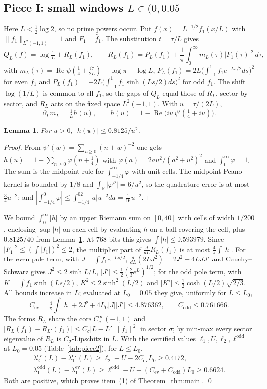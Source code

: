 \documentclass[11pt]{amsart}
\newcommand{\ev}{\mathrm{ev}}
\newcommand{\od}{\mathrm{odd}}
\newcommand{\R}{\mathbb{R}}
\newcommand{\re}{\operatorname{Re}}
\newtheorem{lemma}[theorem]{Lemma}
\theoremstyle{definition}
\theoremstyle{remark}
\numberwithin{equation}{section}
\begin{document}
\subsection{Piece I: small windows $L\in(0,0.05]$}\label{sec:piece1}
Here $L<\tfrac12\log2$, so no prime powers occur. Put $f(x)=L^{-1/2}f_1(x/L)$ with $\|f_1\|_{L^2(-1,1)}=1$ and $F_1=\hat f_1$. The substitution $t=\tau/L$ gives
\[
Q_L(f)=\log\tfrac1L+R_L(f_1),\qquad R_L(f_1)=P_L(f_1)+\frac1\pi\int_0^\infty m_L(\tau)|F_1(\tau)|^2\,d\tau,
\]
with $m_L(\tau)=\re\psi(\tfrac14+\tfrac{i\tau}{2L})-\log\pi+\log L$, $P_L(f_1)=2L\bigl(\int_{-1}^1f_1e^{-Ls/2}ds\bigr)^2$ for even $f_1$ and $P_L(f_1)=-2L\bigl(\int_{-1}^1f_1\sinh(Ls/2)ds\bigr)^2$ for odd $f_1$. The shift $\log(1/L)$ is common to all $f_1$, so the gaps of $Q_L$ equal those of $R_L$, sector by sector, and $R_L$ acts on the fixed space $L^2(-1,1)$. With $u=\tau/(2L)$,
\[
\partial_Lm_L=\tfrac1L h(u),\qquad h(u)=1-\re\bigl(iu\,\psi'(\tfrac14+iu)\bigr).
\]

\begin{lemma}\label{lem:h}
For $u>0$, $|h(u)|\le0.8125/u^2$.
\end{lemma}
\begin{proof}
From $\psi'(w)=\sum_{n\ge0}(n+w)^{-2}$ one gets $h(u)=1-\sum_{n\ge0}\varphi(n+\tfrac14)$ with $\varphi(a)=2au^2/(a^2+u^2)^2$ and $\int_0^\infty\varphi=1$. The sum is the midpoint rule for $\int_{-1/4}^\infty\varphi$ with unit cells. The midpoint Peano kernel is bounded by $1/8$ and $\int_\R|\varphi''|=6/u^2$, so the quadrature error is at most $\tfrac34u^{-2}$; and $|\int_{-1/4}^0\varphi|\le\int_{-1/4}^02|a|u^{-2}da=\tfrac1{16}u^{-2}$.
\end{proof}

We bound $\int_0^\infty|h|$ by an upper Riemann sum on $[0,40]$ with cells of width $1/200$, enclosing $\sup|h|$ on each cell by evaluating $h$ on a ball covering the cell, plus $0.8125/40$ from Lemma~\ref{lem:h}. At $768$ bits this gives $\int|h|\le0.593979$. Since $|F_1|^2\le(\int|f_1|)^2\le2$, the multiplier part of $\frac{d}{dL}R_L(f_1)$ is at most $\frac4\pi\int|h|$. For the even pole term, with $J=\int f_1e^{-Ls/2}$, $\frac{d}{dL}(2LJ^2)=2J^2+4LJJ'$ and Cauchy--Schwarz gives $J^2\le2\sinh L/L$, $|J'|\le\tfrac12(\tfrac23e^L)^{1/2}$; for the odd pole term, with $K=\int f_1\sinh(Ls/2)$, $K^2\le2\sinh^2(L/2)$ and $|K'|\le\tfrac12\cosh(L/2)\sqrt{2/3}$. All bounds increase in $L$; evaluated at $L_0=0.05$ they give, uniformly for $L\le L_0$,
\[
C_\ev=\tfrac4\pi\textstyle\int|h|+2J^2+4L_0|J||J'|\le4.876362,\qquad C_\od\le0.761666.
\]
The forms $R_L$ share the core $C_c^\infty(-1,1)$ and $|R_L(f_1)-R_{L'}(f_1)|\le C_\sigma|L-L'|\|f_1\|^2$ in sector $\sigma$; by min-max every sector eigenvalue of $R_L$ is $C_\sigma$-Lipschitz in $L$. With the certified values $\ell_1,U,\ell_2,\ell^\od$ at $L_0=0.05$ (Table~\ref{tab:piece2}), for $L\le L_0$,
\begin{gather*}
\lambda_2^\ev(L)-\lambda_1^\ev(L)\ge\ell_2-U-2C_\ev L_0\ge0.4172,\\
\lambda_1^\od(L)-\lambda_1^\ev(L)\ge\ell^\od-U-(C_\ev+C_\od)L_0\ge0.6624.
\end{gather*}
Both are positive, which proves item~(1) of Theorem~\ref{thm:main}. \qed
\end{document}
